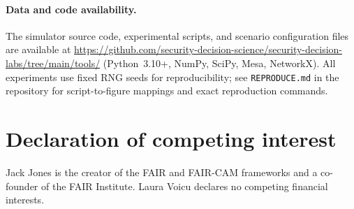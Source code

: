 \documentclass[11pt,a4paper]{article}
\begin{document}
\paragraph{Data and code availability.} The simulator source code, experimental scripts, and scenario configuration files are available at \url{https://github.com/security-decision-science/security-decision-labs/tree/main/tools/} (Python~3.10+, NumPy, SciPy, Mesa, NetworkX). All experiments use fixed RNG seeds for reproducibility; see \texttt{REPRODUCE.md} in the repository for script-to-figure mappings and exact reproduction commands.

\section*{Declaration of competing interest}
Jack Jones is the creator of the FAIR and FAIR-CAM frameworks and a co-founder of the FAIR Institute. Laura Voicu declares no competing financial interests.


\end{document}

